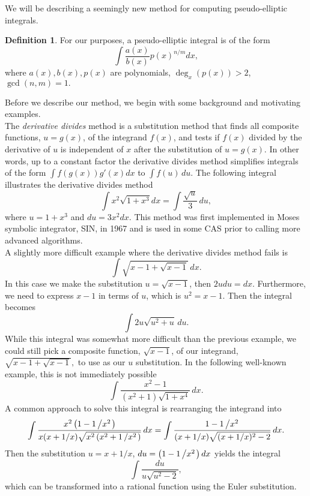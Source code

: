 \documentclass[12pt]{article}
\numberwithin{equation}{section}
\def\todo#1{\textcolor{red}{\textbf{**** TODO -- #1 ****}}}
\theoremstyle{definition}
\newtheorem{definition}{Definition}
\begin{document}


We will be describing a seemingly new method for computing pseudo-elliptic integrals. 
\begin{definition}
For our purposes, a pseudo-elliptic integral is of the form 
$$\int \frac{a(x)}{b(x)}p(x)^{n/m}dx,$$
where $a(x),b(x),p(x)$ are polynomials, $\deg_x(p(x))>2$, $\gcd(n,m)=1.$
\end{definition} 

Before we describe our method, we begin with some background and motivating examples. \\

The \textit{derivative divides} method is a substitution method that finds all composite 
functions, $u=g(x)$, of the integrand $f(x)$, and tests if $f(x)$ divided by the derivative of 
$u$ is independent of $x$ after the substitution of $u=g(x)$. In other words, up to a constant
factor the derivative divides method simplifies integrals of the form $\int f(g(x))g'(x)dx$ to 
$\int f(u) \, du$. The following integral illustrates the derivative divides method 
$$\int x^2\sqrt{1+x^3}dx=\int \frac{\sqrt{u}}{3} \, du,$$ 
where $u=1+x^3$ and $du=3x^2dx$. This method was first implemented in Moses symbolic integrator, 
SIN, in 1967\cite{Moses1967} and is used in some CAS prior to calling more advanced 
algorithms\cite[pp. 473-474]{Geddes1992}.\\

A slightly more difficult example where the derivative divides method fails is 
$$\int \sqrt{x-1+\sqrt{x-1}} \, dx.$$
In this case we make the substitution $u=\sqrt{x-1}$, then $2udu=dx$. Furthermore, we need to 
express $x-1$ in terms of $u$, which is $u^2=x-1$. Then the integral becomes
$$\int 2u\sqrt{u^2+u}\,du.$$
While this integral was somewhat more difficult than the previous example, we could still 
pick a composite function, $\sqrt{x-1}$, of our integrand, $\sqrt{x-1+\sqrt{x-1}},$ to use 
as our $u$ substitution. In the following well-known example, this is not immediately possible
$$\int \frac{x^2-1}{\left(x^2+1\right)\sqrt{1+x^4}} \, dx.$$
A common approach to solve this integral is rearranging the integrand into
$$\int \frac{x^2\left(1-1\left/x^2\right.\right)}{x(x+1/x)\sqrt{x^2\left(x^2+1\left/x^2\right.\right)}} \, dx = 
\int \frac{1-1\left/x^2\right.}{(x+1/x)\sqrt{(x+1/x)^2-2}} \, dx. $$ 
Then the substitution $u=x+1/x$, $du=\left(1-1\left/x^2\right.\right)dx$ yields the integral
$$\int \frac{du}{u\sqrt{u^2-2}},$$
which can be transformed into a rational function using the Euler substitution\cite{Euler}.\\
\end{document}
